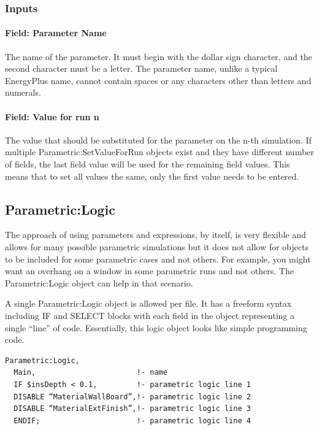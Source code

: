 \subsubsection{Inputs}\label{inputs-030}

\paragraph{Field: Parameter Name}\label{field-parameter-name}

The name of the parameter. It must begin with the dollar sign character, and the second character must be a letter. The parameter name, unlike a typical EnergyPlus name, cannot contain spaces or any characters other than letters and numerals.

\paragraph{Field: Value for run n}\label{field-value-for-run-n}

The value that should be substituted for the parameter on the n-th simulation. If multiple Parametric:SetValueForRun objects exist and they have different number of fields, the last field value will be used for the remaining field values. This means that to set all values the same, only the first value needs to be entered.

\subsection{Parametric:Logic}\label{parametriclogic}

The approach of using parameters and expressions, by itself, is very flexible and allows for many possible parametric simulations but it does not allow for objects to be included for some parametric cases and not others. For example, you might want an overhang on a window in some parametric runs and not others. The Parametric:Logic object can help in that scenario.

A single Parametric:Logic object is allowed per file. It has a freeform syntax including IF and SELECT blocks with each field in the object representing a single ``line'' of code. Essentially, this logic object looks like simple programming code.

\begin{lstlisting}
Parametric:Logic,
  Main,                       !- name
  IF $insDepth < 0.1,         !- parametric logic line 1
  DISABLE “MaterialWallBoard”,!- parametric logic line 2
  DISABLE “MaterialExtFinish”,!- parametric logic line 3
  ENDIF;                      !- parametric logic line 4
\end{lstlisting}

